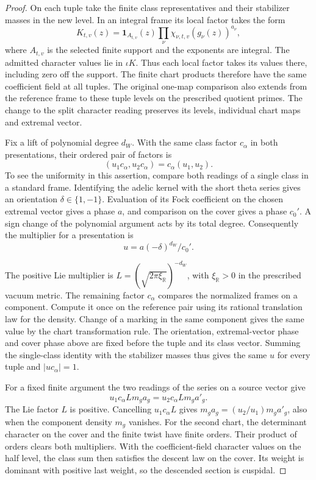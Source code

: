 \begin{proof}
On
each tuple take the finite class representatives and their
stabilizer masses in the new level. In an integral frame its local factor takes the form
\[
         K_{t,v}(z)=\mathbf1_{A_{t,v}}(z)
                         \prod_\nu \chi_{\nu,t,v}(g_\nu(z))^{a_\nu},
\]
where \(A_{t,v}\) is the selected finite support and the exponents
are integral. The admitted character values lie in \(\iota K\).
Thus each local factor takes its values there, including zero
off the support. The finite chart products therefore have the
same coefficient field at all tuples. The original one-map comparison also extends from
the reference frame to these tuple levels on the prescribed
quotient primes. The change to the split character reading
preserves its levels, individual chart maps and extremal vector.
\label{cor:joint-family-estimate-2}

Fix a lift of polynomial degree \(d_W\). With the same class factor \(c_\alpha\) in both presentations, their ordered pair of factors is
\[
 (u_1c_\alpha,u_2c_\alpha)=c_\alpha(u_1,u_2).
\]
To see the uniformity in this assertion, compare both readings
of a single class in a standard frame. Identifying the adelic
kernel with the short theta series gives an orientation
\(\delta\in\{1,-1\}\). Evaluation of its Fock coefficient on
the chosen extremal vector gives a phase \(a\), and comparison
on the cover gives a phase \(c_0'\). A sign change of the
polynomial argument acts by its total degree. Consequently the
multiplier for a presentation is
\[
                 u=a(-\delta)^{d_W}/c_0' .
\]

The positive Lie multiplier is
\(L=(\sqrt{2\pi\xi_{\mathbb R}})^{-d_W}\), with
\(\xi_{\mathbb R}>0\) in the prescribed vacuum metric.
The remaining factor \(c_\alpha\) compares the normalized
frames on a component. Compute it once on the reference pair
using its rational translation law for the density. Change of
a marking in the same component gives the same value by the
chart transformation rule. The orientation, extremal-vector
phase and cover phase above are fixed before the tuple and
its class vector. Summing the single-class identity with the
stabilizer masses thus gives the same \(u\) for every tuple
and \(\lvert u c_\alpha\rvert=1\).
\label{cor:joint-family-estimate-3}

For a fixed finite argument the two readings of the series
on a source vector give
\[
 u_1c_\alpha L m_g a_g=u_2c_\alpha L m_g a'_g .
\]
The Lie factor \(L\) is positive. Cancelling \(u_1c_\alpha L\)
gives \(m_g a_g=(u_2/u_1)m_g a'_g\), also when the component
density \(m_g\) vanishes. For the second chart, the determinant character on the
cover and the finite twist have finite orders. Their product
of orders clears both multipliers. With the coefficient-field
character values on the half level, the class sum then
satisfies the descent law on the cover. Its weight is dominant
with positive last weight, so the descended section is cuspidal.


\end{proof}

